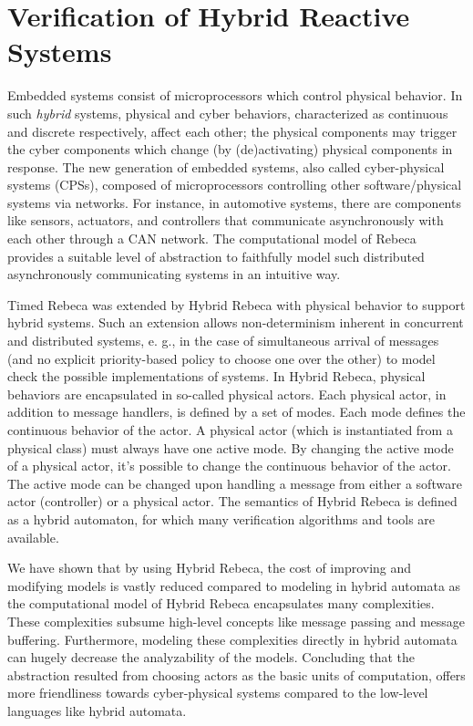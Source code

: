 \section{Verification of Hybrid Reactive Systems}\label{sec::HRebeca}
Embedded systems consist of microprocessors which control physical behavior. In such \emph{hybrid} systems, physical and cyber behaviors, characterized as continuous and discrete respectively, affect each other; the physical components may trigger the cyber components which change (by (de)activating) physical components in response. The new generation of embedded systems, also called cyber-physical systems (CPSs), composed of microprocessors controlling other software/physical systems via networks. For instance, in automotive systems, there are components like sensors, actuators, and controllers that communicate asynchronously with each other through a CAN network. The computational model of Rebeca provides a suitable level of abstraction to faithfully model such distributed asynchronously communicating systems in an intuitive way.

Timed Rebeca was extended by Hybrid Rebeca \cite{HRebeca} with physical behavior to support hybrid systems. Such an extension allows non-determinism inherent in concurrent and distributed systems, e. g., in the case of simultaneous arrival of messages (and no explicit priority-based policy to choose one over the other) to model check the possible implementations of systems. In Hybrid Rebeca, physical behaviors are encapsulated in so-called physical actors. %
%
%
Each physical actor, in addition to message handlers, is defined by a set of modes. Each mode defines the continuous behavior of the actor. A physical actor (which is instantiated from a physical class) must always have one active mode. By changing the active mode of a physical actor, it's possible to change the continuous behavior of the actor. The active mode can be changed upon handling a message from either a software actor (controller) or a physical actor. The semantics of Hybrid Rebeca is defined as a hybrid automaton, for which many verification algorithms and tools are available. 

We have shown that by using Hybrid Rebeca, the cost of improving and modifying models is vastly reduced compared to modeling in hybrid automata \cite{HRebcaSoSym} as the computational model of Hybrid Rebeca encapsulates many complexities. These complexities subsume high-level concepts like message passing and message buffering. Furthermore, modeling these complexities directly in hybrid automata can hugely decrease the analyzability of the models. Concluding that the abstraction resulted from choosing actors as the basic units of computation, offers more friendliness towards cyber-physical systems compared to the low-level languages like hybrid automata.